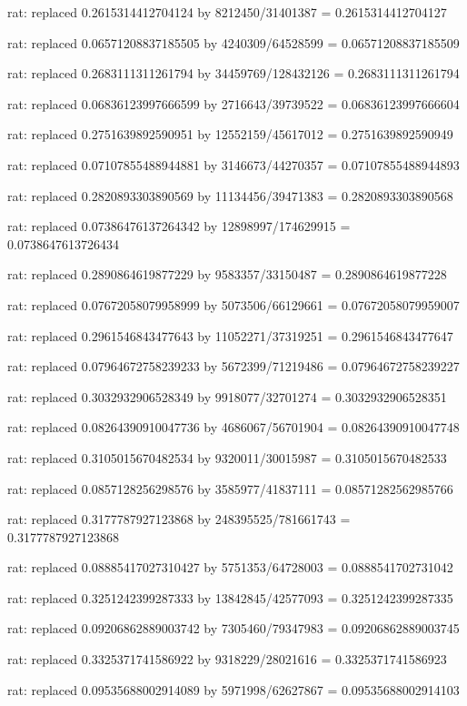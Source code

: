 \documentclass[a4paper,10pt]{article}
\begin{document}
\begin{eulernotebook}
\begin{eulercomment}
\begin{eulercomment}
\begin{eulercomment}
\begin{eulercomment}
\begin{eulercomment}
\begin{eulercomment}
\begin{eulercomment}
\begin{eulercomment}
\begin{eulercomment}
\begin{eulercomment}
\begin{eulercomment}
\begin{eulercomment}
\begin{eulercomment}
\begin{eulercomment}
\begin{eulercomment}
\begin{eulercomment}
\begin{euleroutput}
  rat: replaced 0.2615314412704124 by 8212450/31401387 = 0.2615314412704127
  
  rat: replaced 0.06571208837185505 by 4240309/64528599 = 0.06571208837185509
  
  rat: replaced 0.2683111311261794 by 34459769/128432126 = 0.2683111311261794
  
  rat: replaced 0.06836123997666599 by 2716643/39739522 = 0.06836123997666604
  
  rat: replaced 0.2751639892590951 by 12552159/45617012 = 0.2751639892590949
  
  rat: replaced 0.07107855488944881 by 3146673/44270357 = 0.07107855488944893
  
  rat: replaced 0.2820893303890569 by 11134456/39471383 = 0.2820893303890568
  
  rat: replaced 0.07386476137264342 by 12898997/174629915 = 0.0738647613726434
  
  rat: replaced 0.2890864619877229 by 9583357/33150487 = 0.2890864619877228
  
  rat: replaced 0.07672058079958999 by 5073506/66129661 = 0.07672058079959007
  
  rat: replaced 0.2961546843477643 by 11052271/37319251 = 0.2961546843477647
  
  rat: replaced 0.07964672758239233 by 5672399/71219486 = 0.07964672758239227
  
  rat: replaced 0.3032932906528349 by 9918077/32701274 = 0.3032932906528351
  
  rat: replaced 0.08264390910047736 by 4686067/56701904 = 0.08264390910047748
  
  rat: replaced 0.3105015670482534 by 9320011/30015987 = 0.3105015670482533
  
  rat: replaced 0.0857128256298576 by 3585977/41837111 = 0.08571282562985766
  
  rat: replaced 0.3177787927123868 by 248395525/781661743 = 0.3177787927123868
  
  rat: replaced 0.08885417027310427 by 5751353/64728003 = 0.0888541702731042
  
  rat: replaced 0.3251242399287333 by 13842845/42577093 = 0.3251242399287335
  
  rat: replaced 0.09206862889003742 by 7305460/79347983 = 0.09206862889003745
  
  rat: replaced 0.3325371741586922 by 9318229/28021616 = 0.3325371741586923
  
  rat: replaced 0.09535688002914089 by 5971998/62627867 = 0.09535688002914103
  

\end{euleroutput}
\end{eulercomment}
\end{eulercomment}
\end{eulercomment}
\end{eulercomment}
\end{eulercomment}
\end{eulercomment}
\end{eulercomment}
\end{eulercomment}
\end{eulercomment}
\end{eulercomment}
\end{eulercomment}
\end{eulercomment}
\end{eulercomment}
\end{eulercomment}
\end{eulercomment}
\end{eulercomment}
\end{eulernotebook}
\end{document}
